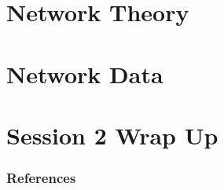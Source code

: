 \documentclass[notes, aspectratio=1610]{beamer}
\begin{document}
\section{Network Theory}

\section{Network Data}

\section{Session 2 Wrap Up}


\begin{frame}
	\frametitle{References}
	\printbibliography
 \end{frame} 
\end{document}
